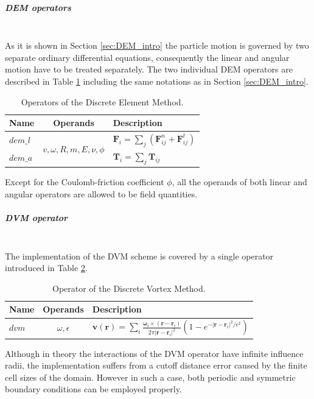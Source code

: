 \documentclass[a4paper,12pt,openany]{book}
\newcommand{\mysubparagraph}[1]{\subparagraph{#1}\mbox{}\\}
\theoremstyle{break}
\begin{document}
\mysubparagraph{DEM operators}
As it is shown in Section \ref{sec:DEM_intro} the particle motion is governed by two separate ordinary differential equations, consequently the linear and angular motion have to be treated separately. The two individual DEM operators are described in Table \ref{tbl:DEM_ops} including the same notations as in Section \ref{sec:DEM_intro}.
\begin{table} [h!]
\begin{center}
\caption{Operators of the Discrete Element Method.} \label{tbl:DEM_ops}
\begin{tabular}{ l c l }
\toprule[1.5pt]
\bf Name & \bf Operands & \bf Description \\ 
\midrule
$dem\_l$ & \multirow{2}{*}{$v, \omega, R, m, E, \nu, \phi$} & $\textbf{F}_i=\sum_{j}{\left(\textbf{F}^n_{ij}+\textbf{F}^t_{ij}\right)}$ \\ 
$dem\_a$ &  & $\textbf{T}_i=\sum_{j}{\textbf{T}_{ij}}$ \\ 
\bottomrule[1.25pt]
\end{tabular}
\end{center}
\end{table}
Except for the Coulomb-friction coefficient $\phi$, all the operands of both linear and angular operators are allowed to be field quantities.


\mysubparagraph{DVM operator}
The implementation of the DVM scheme is covered by a single operator introduced in Table \ref{tbl:DVM_op}. 
\begin{table} [h!]
\begin{center}
\caption{Operator of the Discrete Vortex Method.} \label{tbl:DVM_op}
\begin{tabular}{ l c l }
\toprule[1.5pt]
\bf Name & \bf Operands & \bf Description \\ 
\midrule
$dvm$ & $\omega, \epsilon$ & $\textbf{v}(\textbf{r})=\sum_i\frac{\bm{\omega}_i\times (\textbf{r}-\textbf{r}_i)}{2\pi \vert\textbf{r}-\textbf{r}_i\vert^2}(1-e^{-\vert\textbf{r}-\textbf{r}_i\vert^2/\epsilon^2})$ \\
\bottomrule[1.25pt]
\end{tabular}
\end{center}
\end{table}
Although in theory the interactions of the DVM operator have infinite influence radii, the implementation suffers from a cutoff distance error caused by the finite cell sizes of the domain. However in such a case, both periodic and symmetric boundary conditions can be employed properly.
\end{document}
